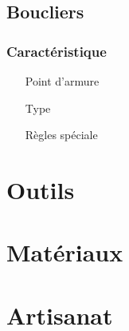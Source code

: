 \subsection{Boucliers}
\subsubsection{Caractéristique}
\begin{itemize}
\item[Point d'armure]
\item[Type]
\item[Règles spéciale]
\end{itemize}
\section{Outils}
\section{Matériaux}
\section{Artisanat}